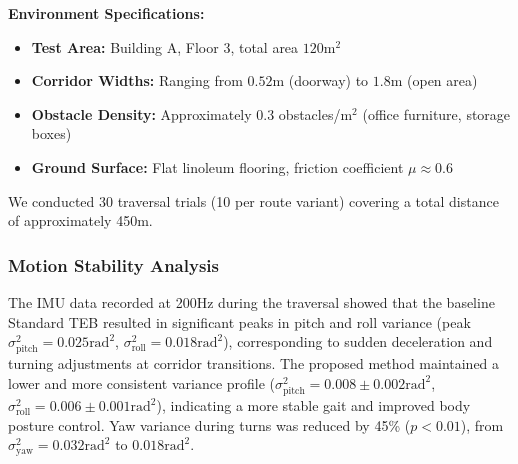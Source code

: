 \documentclass[lettersize,journal]{IEEEtran}
\begin{document}
\textbf{Environment Specifications:}
\begin{itemize}
\item \textbf{Test Area:} Building A, Floor 3, total area $120\text{m}^2$
\item \textbf{Corridor Widths:} Ranging from $0.52\text{m}$ (doorway) to $1.8\text{m}$ (open area)
\item \textbf{Obstacle Density:} Approximately 0.3 obstacles/m$^2$ (office furniture, storage boxes)
\item \textbf{Ground Surface:} Flat linoleum flooring, friction coefficient $\mu \approx 0.6$
\end{itemize}

We conducted 30 traversal trials (10 per route variant) covering a total distance of approximately 450m.

\subsubsection{Motion Stability Analysis}
The IMU data recorded at 200Hz during the traversal showed that the baseline Standard TEB resulted in significant peaks in pitch and roll variance (peak $\sigma^2_{\text{pitch}} = 0.025\text{rad}^2$, $\sigma^2_{\text{roll}} = 0.018\text{rad}^2$), corresponding to sudden deceleration and turning adjustments at corridor transitions. The proposed method maintained a lower and more consistent variance profile ($\sigma^2_{\text{pitch}} = 0.008 \pm 0.002\text{rad}^2$, $\sigma^2_{\text{roll}} = 0.006 \pm 0.001\text{rad}^2$), indicating a more stable gait and improved body posture control. Yaw variance during turns was reduced by 45\% ($p < 0.01$), from $\sigma^2_{\text{yaw}} = 0.032\text{rad}^2$ to $0.018\text{rad}^2$.
\end{document}
